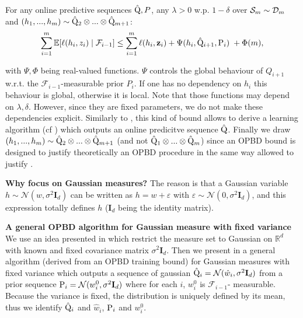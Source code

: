 For any online predictive sequences $\hat{\Q},P$, any $\lambda>0$ w.p. $1-\delta$ over $\Sm\sim\Dm$ and $(h_1,...,h_{m})\sim \hat{\Q}_2\otimes...\otimes \hat{\Q}_{m+1}$:
\begin{align}
  \label{eq: OPBD_train_bound}
  \sum_{i=1}^m  \mathbb{E}[\ell(h_i,z_i) \mid \mathcal{F}_{i-1}]   \leq \sum_{i=1}^m  \ell(h_i,\z_i)  + \Psi(h_{i},\hat{\Q}_{i+1},\P_{i}) \; + \Phi(m),
\end{align}

with $\Psi,\Phi$ being real-valued functions. $\Psi$ controls the global behaviour of $Q_{i+1}$ w.r.t. the $\mathcal{F}_{i-1}$-measurable prior $P_{i}$. If one has no dependency on $h_i$ this behaviour is global, otherwise it is local.
Note that those functions may depend on $\lambda,\delta$. However, since they are fixed parameters, we do not make these dependencies explicit.
Similarly to , this kind of bound allows to derive a learning algorithm (cf ) which outputs an online predicitve sequence $\hat{\Q}$.
Finally we draw $(h_1,...,h_{m})\sim \hat{\Q}_2\otimes...\otimes \hat{\Q}_{m+1}$ (and not $\hat{\Q}_1\otimes...\otimes \hat{\Q}_{m}$)  since an OPBD bound is designed to justify theoretically an OPBD procedure in the same way  allowed to justify .


\textbf{Why focus on Gaussian measures?} The reason is that a Gaussian variable $h\sim\mathcal{N}(w,\sigma^2\mathbf{I}_d)$ can be written as $h=w +\varepsilon$ with $\varepsilon\sim\mathcal{N}(0,\sigma^2\mathbf{I}_d)$, and this expression totally defines $h$ ($\mathbf{I}_d$ being the identity matrix).

\textbf{A general OPBD algorithm for Gaussian measure with fixed variance} We use an idea presented in \citet{viallard2023general} which restrict the measure set to Gaussian on $\mathbb{R}^d$ with known and fixed covariance matrix $\sigma^2 \mathbf{I}_d$.
Then we present in  a general algorithm (derived from an OPBD training bound) for Gaussian measures with fixed variance which outputs a sequence of gaussian $\hat{\Q}_i=\mathcal{N}(\hat{w}_i,\sigma^2\mathbf{I}_d)$ from a prior sequence $\P_{i}= \mathcal{N}(w_i^0,\sigma^2\mathbf{I}_d)$
where for each $i$, $w_i^0$ is $\mathcal{F}_{i-1}$- measurable. Because the variance is fixed, the distribution is uniquely defined by its mean, thus we identify $\hat{\Q}_i$ and $\hat{w}_i$, $\P_{i}$ and $w_i^0$.

